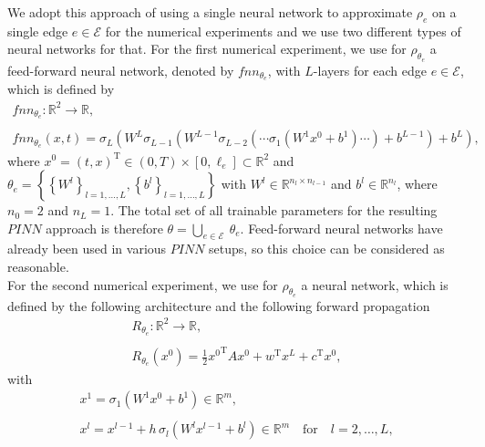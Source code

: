We adopt this approach of using a single neural network to approximate $\rho_e$ on a single edge $e \in \mathcal{E}$ for the numerical experiments and we use two different types of neural networks for that. For the first numerical experiment, we use for $\rho_{\theta_e}$ a feed-forward neural network, denoted by $fnn_{\theta_e}$, with $L$-layers for each edge $e \in \mathcal{E}$, which is defined by 
\begin{gather}
    \label{one_for_each}
    fnn_{\theta_e} \colon \mathbb{R}^2 \to \mathbb{R}, \\
    \\
    fnn_{\theta_e}(x, t) = \sigma_L(W^L \sigma_{L-1}(W^{L-1}\sigma_{L-2}(\cdots \sigma_{1}(W^{1}x^0 +b^1) \cdots) + b^{L-1}) + b^{L}),
\end{gather}
where $x^0 = (t, x)^{\mathrm{T}} \in (0, T) \times [0, \ell_e] \subset \mathbb{R}^2$ and $\theta_e = \left\{ \left\{ W^l \right\}_{l = 1, \ldots, L}, \left\{ b^l \right\}_{l = 1, \ldots, L} \right\}$ with $W^l \in \mathbb{R}^{n_l \times n_{l-1}}$ and $b^l \in \mathbb{R}^{n_l}$, where $n_0 = 2$ and $n_L = 1$. The total set of all trainable parameters for the resulting $PINN$ approach is therefore $\theta = \bigcup_{e \in \mathcal{E}} \ \theta_e$. Feed-forward neural networks have already been used in various $PINN$ setups, so this choice can be considered as reasonable.  \\
For the second numerical experiment, we use for $\rho_{\theta_e}$ a neural network, which is defined by the following architecture and the following forward propagation
\begin{gather}
    \label{Resnet1}
    R_{\theta_e} \colon \mathbb{R}^2 \to \mathbb{R}, \\
    \\
    R_{\theta_e}(x^0) = \frac{1}{2} {x^0}^{\mathrm{T}} A x^0 + w^{\mathrm{T}} x^{L} + c^{\mathrm{T}} x^0,
\end{gather}
with
\begin{gather}
    \label{Resnet2}
    x^1 = \sigma_1(W^1 x^{0} + b^1) \in \mathbb{R}^m, \\
    \\
    x^l = x^{l-1} + h \, \sigma_l(W^l x^{l-1} + b^l) \in \mathbb{R}^m \quad \text{for} \quad l = 2, \ldots, L, 
\end{gather}
